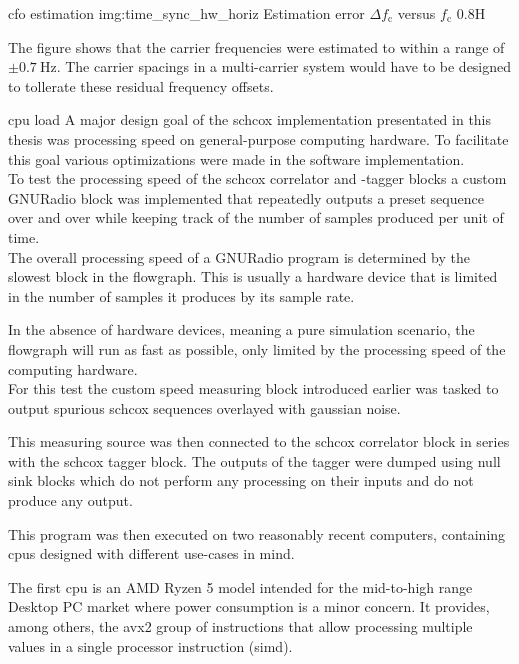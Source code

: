 \begin{subchapter}{\Acrlong{cfo} estimation}
                  {img:time_sync_hw_horiz}
                  {Estimation error $\Delta f_\text{c}$ versus $f_\text{c}$}
                  {0.8}{H}

  The figure shows that the carrier frequencies were
  estimated to within a range of $\pm\SI{0.7}{\hertz}$.
  The carrier spacings in a multi-carrier system
  would have to be designed to tollerate these residual
  frequency offsets.
\end{subchapter}

\begin{subchapter}{\Acrshort{cpu} load}
  A major design goal of the \gls{schcox} implementation
  presentated in this thesis was processing speed on
  general-purpose computing hardware.
  To facilitate this goal various optimizations were
  made in the software implementation. \\

  To test the processing speed of the
  \gls{schcox} correlator and -tagger blocks
  a custom GNURadio block was implemented that repeatedly outputs
  a preset sequence over and over while keeping
  track of the number of samples produced per unit of time. \\

  The overall processing speed of a GNURadio program
  is determined by the slowest block in the flowgraph.
  This is usually a hardware device that is limited in
  the number of samples it produces by its sample rate.

  In the absence of hardware devices, meaning a pure
  simulation scenario, the flowgraph will run as fast
  as possible, only limited by the processing speed
  of the computing hardware. \\

  For this test the custom speed measuring block
  introduced earlier was tasked to output spurious
  \gls{schcox} sequences overlayed with gaussian noise.

  This measuring source was then connected to the
  \gls{schcox} correlator block in series with
  the \gls{schcox} tagger block.
  The outputs of the tagger were dumped using
  null sink blocks which do not perform any processing
  on their inputs and do not produce any output.

  This program was then executed on two reasonably
  recent computers, containing \glspl{cpu} designed
  with different use-cases in mind.

  The first \gls{cpu} is an AMD Ryzen 5 model intended
  for the mid-to-high range Desktop PC market where power
  consumption is a minor concern.
  It provides, among others, the \acrshort{avx2} group of instructions
  that allow processing multiple values in a single processor
  instruction (\acrshort{simd}).


\end{subchapter}
